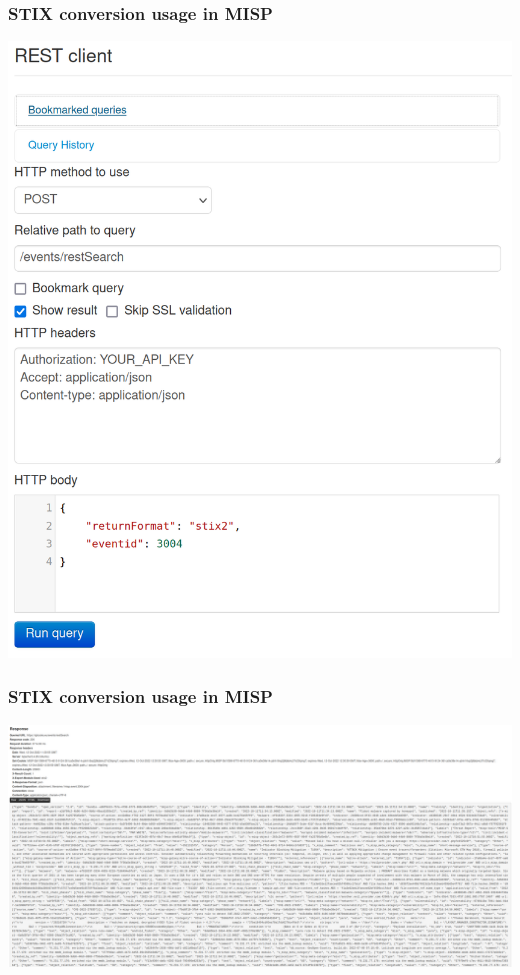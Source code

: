 \begin{frame}
    \frametitle{STIX conversion usage in MISP}
    \centering
    \includegraphics[scale=0.19]{images/simple_rest_query.png}
\end{frame}

\begin{frame}
    \frametitle{STIX conversion usage in MISP}
    \centering
    \includegraphics[scale=0.2]{images/simple_rest_results.png}
\end{frame}

